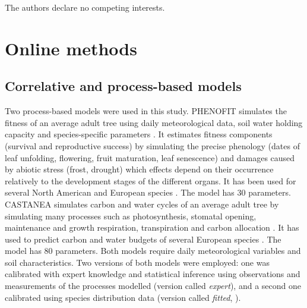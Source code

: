 \documentclass[pdflatex, sn-nature]{sn-jnl}%
\newcommand{\textappr}{\raisebox{0.5ex}{\texttildelow}} %
\begin{document}
The authors declare no competing interests.





\section{Online methods}\label{methods}

\subsection{Correlative and process-based models}\label{models}

Two process-based models were used in this study. 
PHENOFIT simulates the fitness of an average adult tree using daily meteorological data, soil water holding capacity and species-specific parameters \cite{Chuine2001}. It estimates fitness components (survival and reproductive success) by simulating the precise phenology (dates of leaf unfolding, flowering, fruit maturation, leaf senescence) and damages caused by abiotic stress (frost, drought) which effects depend on their occurrence relatively to the development stages of the different organs. It has been used for several North American and European species \cite{Morin2007, Saltre2013, Duputie2015, Gauzere2020}. The model has \textappr30 parameters. 
CASTANEA simulates carbon and water cycles of an average adult tree by simulating many processes such as photosynthesis, stomatal opening, maintenance and growth respiration, transpiration and carbon allocation  \cite{Dufrene2005}. It has used to predict carbon and water budgets of several European species \cite{Davi2006, Delpierre2012, Davi2017}. 
The model has \textappr80 parameters. 
Both models require daily meteorological variables and soil characteristics. 
Two versions of both models were employed: one was calibrated with expert knowledge and statistical inference using observations and measurements of the processes modelled (version called \emph{expert}), and a second one calibrated using species distribution data (version called \emph{fitted}, \cite{VanderMeersch2023}).
  
\end{document}
